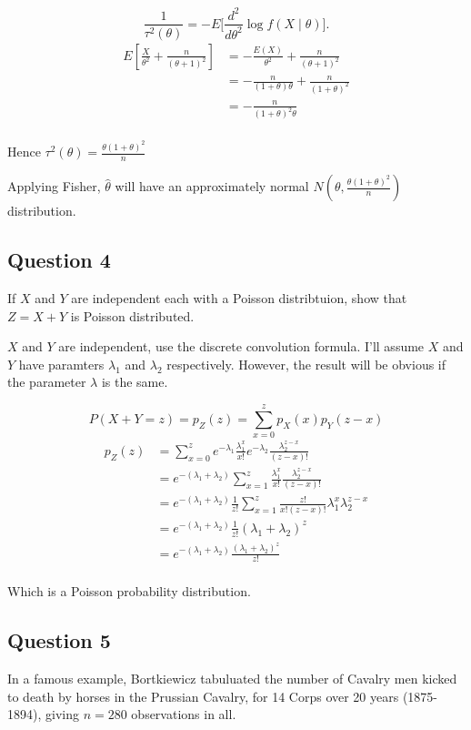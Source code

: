 \documentclass{tufte-book}
\theoremstyle{mytheoremstyle}
\theoremstyle{mylemstyle}
\theoremstyle{mydefstyle}
\begin{document}
\begin{enumerate}
\[ \frac{1}{\tau^2(\theta)} = -E\Big[ \frac{d^2}{d\theta^2} \log f(X\mid \theta)\Big]. \]
\begin{align*}
E[\frac{X}{\theta^2} + \frac{n}{(\theta+1)^2}] &= -\frac{E(X)}{\theta^2} + \frac{n}{(\theta+1)^2}\\
&= -\frac{n}{(1+\theta)\theta} + \frac{n}{(1+\theta)^2}\\
&= -\frac{n}{(1+\theta)^2\theta}\\
\end{align*}

Hence $\tau^2(\theta) = \frac{\theta(1+\theta)^2}{n}$

Applying Fisher, $\hat{\theta}$ will have an approximately normal $N(\theta,\frac{\theta(1+\theta)^2}{n})$ distribution.

\end{enumerate}

\subsection{Question 4}
If $X$ and $Y$ are independent each with a Poisson distribtuion, show that $Z=X+Y$ is Poisson distributed.

 $X$ and $Y$ are independent, use the discrete convolution formula.  I'll assume $X$ and $Y$ have paramters $\lambda_1$ and $\lambda_2$ respectively.  However, the result will be obvious if the parameter $\lambda$ is the same.

\[ P(X+Y=z) = p_Z(z) = \sum_{x=0}^z p_X(x) p_Y(z-x) \]
\begin{align*}
p_Z(z) &= \sum_{x=0}^z e^{-\lambda_1} \frac{\lambda_1^x}{x!} e^{-\lambda_2} \frac{\lambda_2^{z-x}}{(z-x)!}\\
&= e^{-(\lambda_1 + \lambda_2)} \sum_{x=1}^z \frac{\lambda_1^x}{x!} \frac{\lambda_2^{z-x}}{(z-x)!}\\
&= e^{-(\lambda_1 + \lambda_2)}\frac{1}{z!} \sum_{x=1}^z \frac{z!}{x!(z-x)!} \lambda_1^x \lambda_2^{z-x}\\
&= e^{-(\lambda_1 + \lambda_2)}\frac{1}{z!} (\lambda_1+\lambda_2)^z\\
&= e^{-(\lambda_1 + \lambda_2)}\frac{(\lambda_1+\lambda_2)^z}{z!}\\
\end{align*}

Which is a Poisson probability distribution.

\subsection{Question 5}
In a famous example, Bortkiewicz tabuluated the number of Cavalry men kicked to death by horses in the Prussian Cavalry, for 14 Corps over 20 years (1875-1894), giving $n=280$ observations in all.
\end{document}
